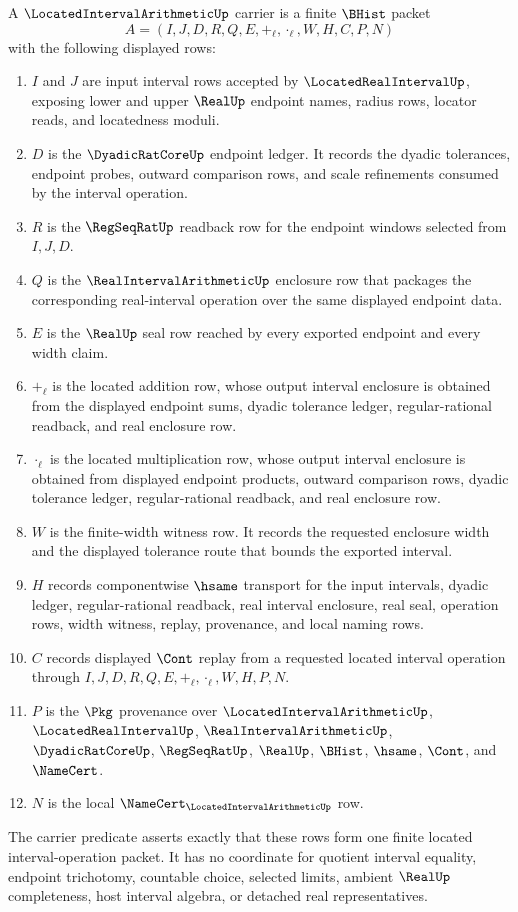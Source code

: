 \begin{definition}
\label{def:located-interval-arithmetic-carrier}
A $\LocatedIntervalArithmeticUp$ carrier is a finite $\BHist$ packet
$$
A=(I,J,D,R,Q,E,+_\ell,\cdot_\ell,W,H,C,P,N)
$$
with the following displayed rows:
\begin{enumerate}
\item $I$ and $J$ are input interval rows accepted by $\LocatedRealIntervalUp$, exposing lower and upper $\RealUp$ endpoint names, radius rows, locator reads, and locatedness moduli.
\item $D$ is the $\DyadicRatCoreUp$ endpoint ledger. It records the dyadic tolerances, endpoint probes, outward comparison rows, and scale refinements consumed by the interval operation.
\item $R$ is the $\RegSeqRatUp$ readback row for the endpoint windows selected from $I,J,D$.
\item $Q$ is the $\RealIntervalArithmeticUp$ enclosure row that packages the corresponding real-interval operation over the same displayed endpoint data.
\item $E$ is the $\RealUp$ seal row reached by every exported endpoint and every width claim.
\item $+_\ell$ is the located addition row, whose output interval enclosure is obtained from the displayed endpoint sums, dyadic tolerance ledger, regular-rational readback, and real enclosure row.
\item $\cdot_\ell$ is the located multiplication row, whose output interval enclosure is obtained from displayed endpoint products, outward comparison rows, dyadic tolerance ledger, regular-rational readback, and real enclosure row.
\item $W$ is the finite-width witness row. It records the requested enclosure width and the displayed tolerance route that bounds the exported interval.
\item $H$ records componentwise $\hsame$ transport for the input intervals, dyadic ledger, regular-rational readback, real interval enclosure, real seal, operation rows, width witness, replay, provenance, and local naming rows.
\item $C$ records displayed $\Cont$ replay from a requested located interval operation through $I,J,D,R,Q,E,+_\ell,\cdot_\ell,W,H,P,N$.
\item $P$ is the $\Pkg$ provenance over $\LocatedIntervalArithmeticUp$, $\LocatedRealIntervalUp$, $\RealIntervalArithmeticUp$, $\DyadicRatCoreUp$, $\RegSeqRatUp$, $\RealUp$, $\BHist$, $\hsame$, $\Cont$, and $\NameCert$.
\item $N$ is the local $\NameCert_{\LocatedIntervalArithmeticUp}$ row.
\end{enumerate}
The carrier predicate asserts exactly that these rows form one finite located interval-operation packet. It has no coordinate for quotient interval equality, endpoint trichotomy, countable choice, selected limits, ambient $\RealUp$ completeness, host interval algebra, or detached real representatives.
\end{definition}


